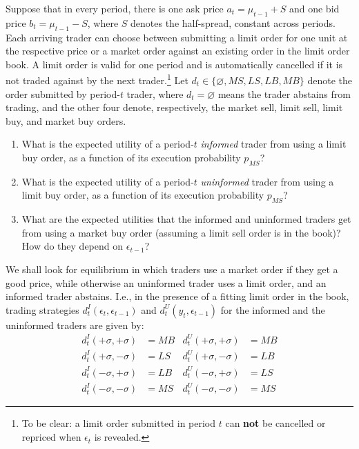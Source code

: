 \documentclass[a4paper]{article}
\begin{document}
	Suppose that in every period, there is one ask price $a_t = \mu_{t-1} + S$ and one bid price $b_t = \mu_{t-1} - S$, where $S$ denotes the half-spread, constant across periods. 
	Each arriving trader can choose between submitting a limit order for one unit at the respective price or a market order against an existing order in the limit order book. A limit order is valid for one period and is automatically cancelled if it is not traded against by the next trader.\footnote{To be clear: a limit order submitted in period $t$ can \textbf{not} be cancelled or repriced when $\epsilon_t$ is revealed.}
	Let $d_t \in \{\varnothing,MS,LS,LB,MB\}$ denote the order submitted by period-$t$ trader, where $d_t = \varnothing$ means the trader abstains from trading, and the other four denote, respectively, the market sell, limit sell, limit buy, and market buy orders.
	
	\begin{enumerate}
		\item What is the expected utility of a period-$t$ \emph{informed} trader from using a limit buy order, as a function of its execution probability $p_{MS}$?
		
		\item What is the expected utility of a period-$t$ \emph{uninformed} trader from using a limit buy order, as a function of its execution probability $p_{MS}$?
		
		\item What are the expected utilities that the informed and uninformed traders get from using a market buy order (assuming a limit sell order is in the book)? How do they depend on $\epsilon_{t-1}$?
	\end{enumerate}
	
	We shall look for equilibrium in which traders use a market order if they get a good price, while otherwise an uninformed trader uses a limit order, and an informed trader abstains. I.e., in the presence of a fitting limit order in the book, trading strategies $d^I_t(\epsilon_{t}, \epsilon_{t-1})$ and $d^U_t(y_t, \epsilon_{t-1})$ for the informed and the uninformed traders are given by:
	\begin{align*}
		d^I_t(+\sigma, +\sigma) &= MB
		& d^U_t(+\sigma, +\sigma) &= MB
		\\
		d^I_t(+\sigma, -\sigma) &= LS
		& d^U_t(+\sigma, -\sigma) &= LB
		\\
		d^I_t(-\sigma, +\sigma) &= LB
		& d^U_t(-\sigma, +\sigma) &= LS
		\\
		d^I_t(-\sigma, -\sigma) &= MS
		& d^U_t(-\sigma, -\sigma) &= MS
	\end{align*}
	
\end{document}
